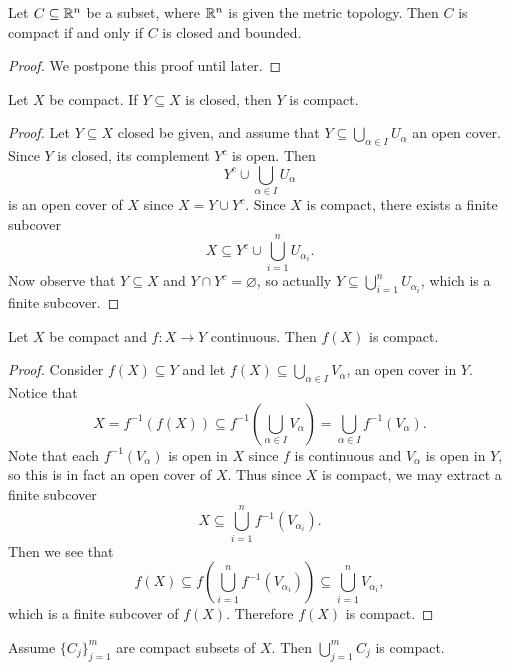 \begin{theorem}
  Let $C \subseteq \mathbb{R}^n$ be a subset, where
  $\mathbb{R}^n$ is given the metric topology. Then
  $C$ is compact if and only if $C$ is closed and bounded.
\end{theorem}

\begin{proof}
  We postpone this proof until later.
\end{proof}

\begin{lemma}
  Let $X$ be compact. If $Y \subseteq X$ is closed,
  then $Y$ is compact.
\end{lemma}

\begin{proof}
  Let $Y \subseteq X$ closed be given, and assume that
  $Y \subseteq \bigcup_{\alpha \in I} U_\alpha$
  an open cover. Since $Y$ is closed,
  its complement $Y^c$ is open. Then
  \[
    Y^c \cup \bigcup_{\alpha \in I} U_\alpha
  \]
  is an open cover of $X$ since $X = Y \cup Y^c$.
  Since $X$ is compact, there exists a finite subcover
  \[
    X \subseteq Y^c \cup \bigcup_{i = 1}^n U_{\alpha_i}.
  \]
  Now observe that $Y \subseteq X$ and
  $Y \cap Y^c = \varnothing$,
  so actually $Y \subseteq \bigcup_{i = 1}^n U_{\alpha_i}$,
  which is a finite subcover.
\end{proof}

\begin{theorem}
  Let $X$ be compact and $f : X \to Y$
  continuous. Then $f(X)$ is compact.
\end{theorem}

\begin{proof}
  Consider $f(X) \subseteq Y$ and let
  $f(X) \subseteq \bigcup_{\alpha \in I} V_\alpha$, an
  open cover in $Y$. Notice that
  \[
    X = f^{-1}(f(X))
    \subseteq f^{-1}\left(\bigcup_{\alpha \in I} V_\alpha\right)
    = \bigcup_{\alpha \in I} f^{-1}(V_\alpha).
  \]
  Note that each $f^{-1}(V_\alpha)$ is open in $X$ since $f$ is
  continuous and $V_\alpha$ is open in $Y$, so
  this is in fact an open cover of $X$. Thus since $X$ is
  compact, we may extract a finite subcover
  \[
    X \subseteq \bigcup_{i = 1}^n f^{-1}(V_{\alpha_i}).
  \]
  Then we see that
  \[
    f(X) \subseteq f\left(\bigcup_{i = 1}^n f^{-1}(V_{\alpha_i})\right)
    \subseteq \bigcup_{i = 1}^n V_{\alpha_i},
  \]
  which is a finite subcover of $f(X)$. Therefore
  $f(X)$ is compact.
\end{proof}

\begin{theorem}
  Assume $\{C_j\}_{j = 1}^m$ are compact subsets
  of $X$. Then $\bigcup_{j = 1}^m C_j$ is compact.
\end{theorem}

